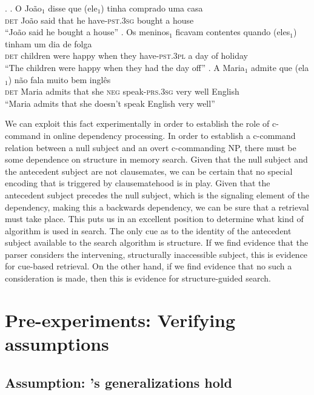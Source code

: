 \documentclass[12pt,letterpaper]{article}
\begin{document}
\ex. \label{bp-coref} \ag. O João$_1$ disse que (ele$_1$) tinha comprado uma casa \label{bp-coref-a} \\
                           \textsc{det} João said that he have-\textsc{pst}.\textsc{3sg} bought a house\\
                           ``João said he bought a house''
                      \bg. Os meninos$_1$ ficavam contentes quando (eles$_1$) tinham um dia de folga \label{bp-coref-b} \\
                           \textsc{det} children were happy when they have-\textsc{pst}.\textsc{3pl} a day of holiday\\
                           ``The children were happy when they had the day off''
                      \cg. A Maria$_1$ admite que (ela$_1$) não fala muito bem inglês \label{bp-coref-c} \\
                           \textsc{det} Maria admits that she \textsc{neg} speak-\textsc{prs}.\textsc{3sg} very well English\\
                           ``Maria admits that she doesn't speak English very well'' 


We can exploit this fact experimentally in order to establish the role of c-command in online dependency processing. In order to establish a c-command relation between a null subject and an overt c-commanding NP, there must be some dependence on structure in memory search. Given that the null subject and the antecedent subject are not clausemates, we can be certain that no special encoding that is triggered by clausematehood is in play. Given that the antecedent subject precedes the null subject, which is the signaling element of the dependency, making this a backwards dependency, we can be sure that a retrieval must take place. This puts us in an excellent position to determine what kind of algorithm is used in search. The only cue as to the identity of the antecedent subject available to the search algorithm is structure. If we find evidence that the parser considers the intervening, structurally inaccessible subject, this is evidence for cue-based retrieval. On the other hand, if we find evidence that no such a consideration is made, then this is evidence for structure-guided search.

\section{Pre-experiments: Verifying assumptions}

\subsection{Assumption: \citet{holmberg09}'s generalizations hold}
\end{document}
